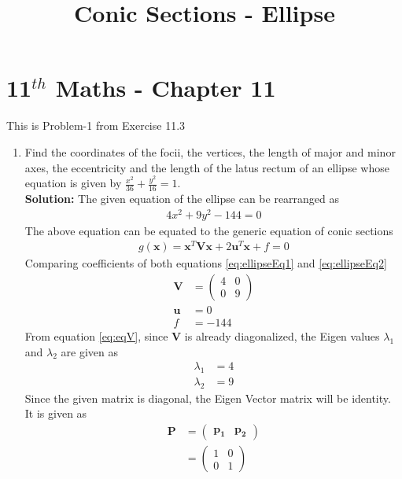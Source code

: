\documentclass[12pt]{article}
\providecommand{\brak}[1]{\ensuremath{\left(#1\right)}}
\newcommand{\solution}{\noindent \textbf{Solution: }}
\newcommand{\myvec}[1]{\ensuremath{\begin{pmatrix}#1\end{pmatrix}}}
\let\vec\mathbf
\begin{document}
\begin{center}
\title{\textbf{Conic Sections - Ellipse}}
\date{\vspace{-5ex}} %
\maketitle
\end{center}
\setcounter{page}{1}

\section{11$^{th}$ Maths - Chapter 11}
This is Problem-1 from Exercise 11.3
\begin{enumerate}
	\item Find the coordinates of the focii, the vertices, the length of major and minor axes, the eccentricity and the length of the latus rectum of an ellipse whose equation is given by $\frac{x^2}{36}+\frac{y^2}{16} = 1$. \\ 
\solution 
The given equation of the ellipse can be rearranged as
\begin{align}
    \label{eq:ellipseEq1}
    4x^2 + 9y^2-144 = 0
\end{align}
The above equation can be equated to the generic equation of conic sections
\begin{align}
	\label{eq:ellipseEq2}
	g\brak{\vec{x}} = \vec{x}^T\vec{V}\vec{x} + 2\vec{u}^T\vec{x} + f = 0 
\end{align}
Comparing coefficients of both equations \eqref{eq:ellipseEq1} and \eqref{eq:ellipseEq2} 
\begin{align}
	\label{eq:eqV}
	\vec{V} &= \myvec{ 4 & 0 \\ 0 & 9} \\
	\label{eq:eqU}
	\vec{u} &=  0 \\
	\label{eq:eqF}
	f &= -144 
\end{align}
From equation \eqref{eq:eqV}, since $\vec{V}$ is already diagonalized, the Eigen values $\lambda_1$ and $\lambda_2$ are given as 
\begin{align}
	\label{eq:eqEigen1}
	\lambda_1 &= 4 \\
	\label{eq:eqEigen2}
	\lambda_2 &= 9 
\end{align}
Since the given matrix is diagonal, the Eigen Vector matrix will be identity. It is given as
\begin{align}
	\vec{P} &= \myvec{ \vec{p_1} & \vec{p_2}} \\
	&= \myvec{ 1 & 0 \\ 0 & 1}

\end{align}
\end{enumerate}
\end{document}
